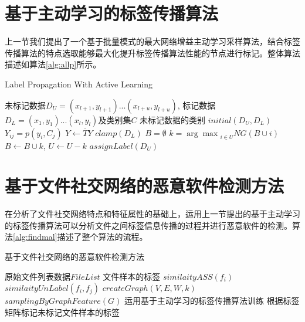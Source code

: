 \section{基于主动学习的标签传播算法}
上一节我们提出了一个基于批量模式的最大网络增益主动学习采样算法，结合标签传播算法的特点选取能够最大化提升标签传播算法性能的节点进行标记。整体算法描述如算法\ref{alg:allp}所示。
\begin{algorithm}
\caption{Label Propagation With Active Learning}
\label{alg:allp}
\begin{algorithmic}
\Input 未标记数据$D_{U}=(x_{l+1},y_{l+1})...(x_{l+u},y_{l+u})$, 标记数据$D_{L}=(x_{1},y_{1})...(x_{l},y_{l})$及类别集$C$
\Output 未标记数据的类别
\Repeat
\State $initial(D_{U}, D_{L})$ 
 
\State $Y_{ij} = p(y_{i},C_{j})$
\EndFor
\EndFor
\Repeat
\State $Y\leftarrow \overline{T}Y$ 
\State $clamp(D_{L})$ 
\State $B=\emptyset$  
\Repeat
\State $k={\arg\max}_{i \in U}{NG(B\cup {i})}$
\State $B\leftarrow B\cup {k}$, $U\leftarrow U-{k}$
  
\State $assignLabel(D_{U})$
\end{algorithmic}
\end{algorithm}

\section{基于文件社交网络的恶意软件检测方法}
在分析了文件社交网络特点和特征属性的基础上，运用上一节提出的基于主动学习的标签传播算法可以分析文件之间标签信息传播的过程并进行恶意软件的检测。算法\ref{alg:findmal}描述了整个算法的流程。

\begin{algorithm}
\caption{基于文件社交网络的恶意软件检测方法}
\label{alg:findmal}
\begin{algorithmic}
\Input 原始文件列表数据$FileList$
\Output 文件样本的标签
\State $similaityASS(f_{i})$
\EndFor
{}
\State $similaityUnLabel(f_{i},f_{j})$
\EndIf
\EndFor
\EndFor
\State $createGraph(V,E,W,k)$
\State $samplingByGraphFeature(G)$
\State 运用基于主动学习的标签传播算法训练
\State 根据标签矩阵标记未标记文件样本的标签
\end{algorithmic}
\end{algorithm}

